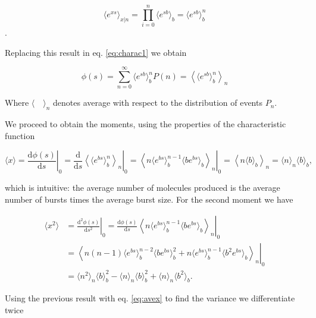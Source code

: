 \begin{equation*}
  \langle e^{xs}\rangle_{x|n} = \prod_{i=0}^n\langle e^{sb}\rangle_b = \langle e^{sb}\rangle_b^n
\end{equation*}.

Replacing this result in eq. \eqref{eq:charac1} we obtain

\begin{equation*}
  \phi(s) = \sum_{n=0}^\infty \langle e^{sb}\rangle_b^n P(n) = \left\langle\langle e^{sb}\rangle_b^n\right\rangle_n
\end{equation*}

Where $\langle\quad\rangle_n$ denotes average with respect to the distribution of events $P_n$.

We proceed to obtain the moments, using the properties of the characteristic function

\begin{equation}
  \label{eq:avex}
  \langle x\rangle = \left.\frac{\mathrm{d}\phi(s)}{\mathrm{d}s}\right|_0 = \left.\frac{\mathrm{d}}{\mathrm{d}s}\left\langle\langle e^{bs}\rangle_b^n\right\rangle_n\right|_0 = \left.\left\langle n\langle e^{bs}\rangle_b^{n-1}\langle b e^{bs}\rangle_b\right\rangle_n\right|_0 = \left\langle n\langle b\rangle_b\right\rangle_n = \langle n\rangle_n\langle b\rangle_b,
\end{equation}

which is intuitive: the average number of molecules produced is the average number of bursts times the average burst size. For the second moment we have

\begin{equation*}
  \begin{split}
    \langle x^2\rangle &= \left.\frac{\mathrm{d^2}\phi(s)}{\mathrm{d}s^2}\right|_0 = \left.\frac{\mathrm{d}\phi(s)}{\mathrm{d}s}\left\langle n\langle e^{bs}\rangle_b^{n-1}\langle b e^{bs}\rangle_b\right\rangle_n\right|_0\\
  &= \left.\left\langle n(n-1)\langle e^{bs}\rangle^{n-2}_b\langle be^{bs}\rangle^2_b+n\langle e^{bs}\rangle^{n-1}_b\langle b^2e^{bs}\rangle_b\right\rangle_n\right|_0\\
  &=\langle n^2\rangle_n\langle b\rangle_b^2-\langle n\rangle_n\langle b\rangle_b^2+\langle n\rangle_n\langle b^2\rangle_b.
  \end{split}
\end{equation*}

Using the previous result with eq. \eqref{eq:avex} to find the variance we differentiate twice

